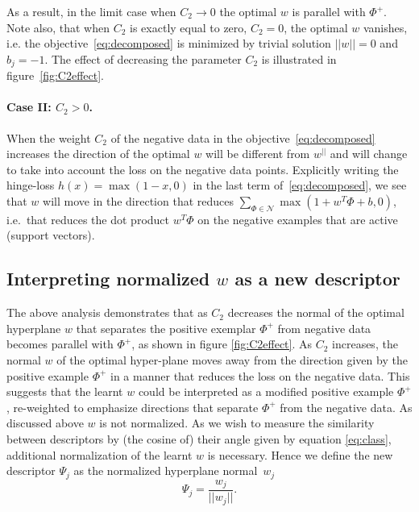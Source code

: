 \documentclass[10pt,twocolumn,letterpaper]{article}
\begin{document}
         As a result, in the limit case when $C_2 \rightarrow 0$ the optimal $w$ is parallel with $\Phi^+$. Note also, that when $C_2$ is exactly equal to zero, $C_2=0$, the optimal $w$ vanishes, i.e. the objective~\eqref{eq:decomposed} is minimized by trivial solution $||w||=0$ and $b_j=-1$. The effect of decreasing the parameter $C_2$ is illustrated in figure~\ref{fig:C2effect}.


      \paragraph{Case II: $C_2>0$.}
         When the weight $C_2$ of the negative data in the objective~\eqref{eq:decomposed} increases the direction of the optimal $w$ will be different from $w^{||}$ and will change to take into account the loss on the negative data points. Explicitly writing the hinge-loss $h(x) = \max(1-x,0)$ in the last term of~\eqref{eq:decomposed}, we see that $w$ will move in the direction that reduces $\sum_{\Phi\in \mathcal N}\max \left(1+w^T \Phi + b ,0 \right)$, i.e.\ that reduces the dot product $w^T \Phi$ on the negative examples that are active (support vectors).

   \subsection{Interpreting normalized $w$ as a new descriptor} %
      The above analysis demonstrates that as $C_2$ decreases the normal of the optimal hyperplane $w$ that separates the positive exemplar $\Phi^+$ from negative data becomes parallel with $\Phi^+$, as shown in figure \ref{fig:C2effect}. As $C_2$ increases, the normal $w$ of the optimal hyper-plane moves away from the direction given by the positive example $\Phi^+$ in a manner that reduces the loss on the negative data. 
      This suggests that the learnt $w$ could be interpreted as a modified positive example $\Phi^+$, re-weighted to emphasize directions that separate $\Phi^+$ from the negative data. As discussed above $w$ is not normalized. As we wish to measure the similarity between descriptors by (the cosine of) their angle given by equation \eqref{eq:class}, additional normalization of the learnt $w$ is necessary. Hence we define the new descriptor $\Psi_j$ as the normalized hyperplane normal~$w_j$
      \begin{equation}
         \label{eq:normalization}
         \Psi_j=\dfrac{w_j}{||w_j||}.
      \end{equation}
\end{document}
